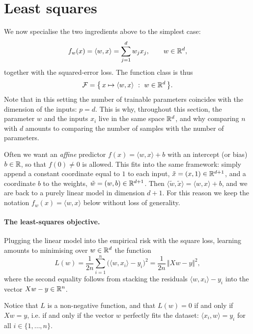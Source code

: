 \section{Least squares}
\label{sec:least-squares}

We now specialise the two ingredients above to the simplest case:
\[
f_w(x) = \langle w, x \rangle = \sum_{j=1}^d w_j x_j , \qquad w \in \mathbb{R}^d ,
\]
together with the squared-error loss. The function class is thus
\[
\mathcal{F} = \big\{\, x \mapsto \langle w, x \rangle \ : \ w \in \mathbb{R}^d \,\big\} .
\]
Note that in this setting the number of trainable parameters coincides with the dimension of the inputs: $p = d$. This is why, throughout this section, the parameter $w$ and the inputs $x_i$ live in the same space $\mathbb{R}^d$, and why comparing $n$ with $d$ amounts to comparing the number of samples with the number of parameters.

\begin{remark}
Often we want an \emph{affine} predictor $f(x) = \langle w, x \rangle + b$ with
an intercept (or bias) $b \in \mathbb{R}$, so that $f(0) \neq 0$ is allowed. This fits
into the same framework: simply append a constant coordinate equal to $1$ to
each input, $\tilde{x} = (x, 1) \in \mathbb{R}^{d+1}$, and a coordinate $b$ to the
weights, $\tilde{w} = (w, b) \in \mathbb{R}^{d+1}$. Then
$\langle \tilde{w}, \tilde{x}\rangle = \langle w, x \rangle + b$, and we are
back to a purely linear model in dimension $d+1$. For this reason we keep the
notation $f_w(x) = \langle w, x \rangle$ below without loss of generality.
\end{remark}

\paragraph{The least-squares objective.}
Plugging the linear model into the empirical risk with the square loss, learning amounts to
minimising over $w \in \mathbb{R}^d$ the function
\[
L(w) = \frac{1}{2n} \sum_{i=1}^n \big( \langle w, x_i \rangle - y_i \big)^2
     = \frac{1}{2n} \, \Vert X w - y \Vert^2 ,
\]
where the second equality follows from stacking the residuals
$\langle w, x_i\rangle - y_i$ into the vector $Xw - y \in \mathbb{R}^n$. 

\begin{remark}
Notice that $L$ is a non-negative function, and that $L(w) = 0$ if and only if $X w = y$, i.e. if and only if the vector $w$ perfectly fits the dataset: $\langle x_i, w \rangle = y_i$ for all $i \in \{1, \dots, n\}$.
\end{remark}

